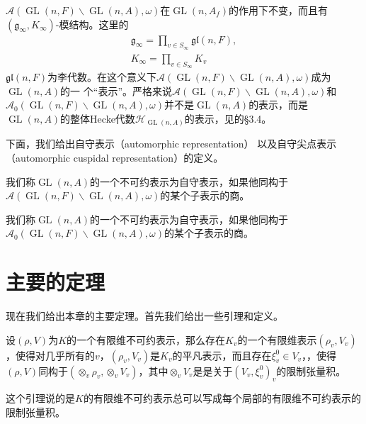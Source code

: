 $\mathcal{A}(\operatorname{GL}(n,F) \backslash \operatorname{GL}(n,A), \omega)$在$\operatorname{GL}(n, A_f)$的作用下不变，而且有$(\mathfrak{g}_\infty,  K_\infty)$-模结构。这里的
\begin{gather*}
    \mathfrak{g}_\infty = \prod\limits_{v\in S_\infty} \mathfrak{gl}(n, F), \\[1em]
    K_\infty = \prod\limits_{v\in S_\infty} K_v
\end{gather*}
$\mathfrak{gl}(n, F)$为李代数。在这个意义下$\mathcal{A}(\operatorname{GL}(n,F) \backslash \operatorname{GL}(n,A), \omega)$成为$\operatorname{GL}(n,A)$的一
个``表示''。严格来说$\mathcal{A}(\operatorname{GL}(n,F) \backslash \operatorname{GL}(n,A), \omega)$和$\mathcal{A}_0(\operatorname{GL}(n,F) \backslash \operatorname{GL}(n,A), \omega)$并不是$\operatorname{GL}(n,A)$的表示，而是$\operatorname{GL}(n,A)$的整体Hecke代数$\mathcal{H}_{\operatorname{GL}(n,A)}$的表示，见的\S 3.4。

下面，我们给出自守表示（automorphic representation） 以及自守尖点表示（automorphic cuspidal representation）的定义。

\begin{definition}[自守表示]
我们称$\operatorname{GL}(n,A)$的一个不可约表示为自守表示，如果他同构于$\mathcal{A}(\operatorname{GL}(n,F) \backslash \operatorname{GL}(n,A), \omega)$的某个子表示的商。
\end{definition}

\begin{definition}[自守尖点表示]
我们称$\operatorname{GL}(n,A)$的一个不可约表示为自守表示，如果他同构于$\mathcal{A}_0(\operatorname{GL}(n,F) \backslash \operatorname{GL}(n,A), \omega)$的某个子表示的商。
\end{definition}

\section{主要的定理}

现在我们给出本章的主要定理。首先我们给出一些引理和定义。

\begin{lemma}
设$(\rho, V)$为$K$的一个有限维不可约表示，那么存在$K_v$的一个有限维表示$(\rho_v, V_v)$，使得对几乎所有的$v$，$(\rho_v, V_v)$是$K_v$的平凡表示，而且存在$\xi_v^0\in V_v$，，使得$(\rho, V)$同构于$(\otimes_{v}\rho_v, \otimes_v V_v)$，其中$\otimes_v V_v$是是关于$(V_v,\xi_v^0)_v$的限制张量积。
\end{lemma}
这个引理说的是$K$的有限维不可约表示总可以写成每个局部的有限维不可约表示的限制张量积。

